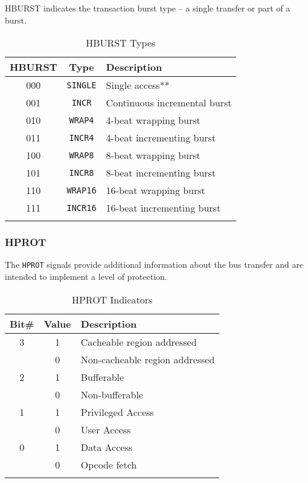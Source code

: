 HBURST indicates the transaction burst type -- a single transfer or part
of a burst.

\begin{table}[h]
	\begin{tabular*}{0.6\textwidth}{@{\extracolsep{\fill}}ccl}	
		\thickhline 
		\textbf{HBURST} & \textbf{Type} & \textbf{Description}\\
		\hline 
		000 & \texttt{SINGLE} & Single access**\\
		001 & \texttt{INCR} & Continuous incremental burst\\
		010 & \texttt{WRAP4} & 4-beat wrapping burst\\
		011 & \texttt{INCR4} & 4-beat incrementing burst\\
		100 & \texttt{WRAP8} & 8-beat wrapping burst\\
		101 & \texttt{INCR8} & 8-beat incrementing burst\\
		110 & \texttt{WRAP16} & 16-beat wrapping burst\\
		111 & \texttt{INCR16} & 16-beat incrementing burst\\		\thickhline 	
	\end{tabular*} 
	\caption{HBURST Types}
	\label{tab:HBURST}
\end{table}

\subsubsection{HPROT}

The \texttt{HPROT} signals provide additional information about the bus
transfer and are intended to implement a level of protection.

\begin{table}[h]
	\begin{tabular*}{0.6\textwidth}{@{\extracolsep{\fill}}ccl}	
		\thickhline 
		\textbf{Bit\#} & \textbf{Value} & \textbf{Description}\\
		\hline 
		3 & 1 & Cacheable region addressed\\
		& 0 & Non-cacheable region addressed\\
		2 & 1 & Bufferable\\
		& 0 & Non-bufferable\\
		1 & 1 & Privileged Access\\
		& 0 & User Access\\
		0 & 1 & Data Access\\
		& 0 & Opcode fetch\\
		\thickhline 	
	\end{tabular*} 
	\caption{HPROT Indicators}
	\label{tab:HPROT}
\end{table}


